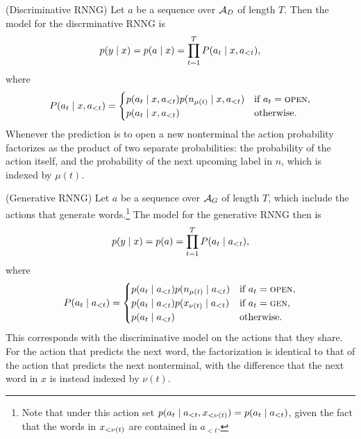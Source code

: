     \begin{definition}{(Discriminative RNNG)}
      \label{def:disc-rnng}
      Let $a$ be a sequence over $\mathcal{A}_D$ of length $T$. Then the model for the discrminative RNNG is
      \begin{align*}
        p(y \mid x) = p(a \mid x) = \prod_{t=1}^T P( a_t \mid x, a_{<t}),
      \end{align*}
      where
      \begin{equation*}
        P( a_t \mid x, a_{<t}) =
        \begin{cases}
          p( a_t \mid x, a_{<t} ) p( n_{ \mu(t) } \mid x, a_{<t} ) & \text{if } a_t = \textsc{open},  \\
          p( a_t \mid x, a_{<t} ) & \text{otherwise.}  \\
        \end{cases}
      \end{equation*}
    Whenever the prediction is to open a new nonterminal the action probability factorizes as the product of two separate probabilities: the probability of the action itself, and the probability of the next upcoming label in $n$, which is indexed by $\mu(t)$.
    \end{definition}

    \begin{definition}{(Generative RNNG)}
      \label{def:gen-rnng}
      Let $a$ be a sequence over $\mathcal{A}_G$ of length $T$, which include the actions that generate words.\footnote{Note that under this action set $p(a_t \mid a_{<t}, x_{<\nu(t)}) = p(a_t \mid a_{<t})$, given the fact that the words in $x_{<\nu(t)}$ are contained in $a_{<t}$.} The model for the generative RNNG then is
      \begin{align*}
        p(y \mid x) = p(a) = \prod_{t=1}^T P( a_t \mid a_{<t}),
      \end{align*}
      where
      \begin{equation*}
        P( a_t \mid a_{<t} ) =
        \begin{cases}
          p( a_t \mid a_{<t} ) p(n_{ \mu(t) } \mid a_{<t} ) & \text{if } a_t = \textsc{open},  \\
          p( a_t \mid a_{<t} ) p(x_{ \nu(t) } \mid a_{<t} ) & \text{if } a_t = \textsc{gen},  \\
          p( a_t \mid a_{<t} ) & \text{otherwise.}  \\
        \end{cases}
      \end{equation*}
      This corresponds with the discriminative model on the actions that they share. For the action that predicts the next word, the factorization is identical to that of the action that predicts the next nonterminal, with the difference that the next word in $x$ is instead indexed by $\nu(t)$.
    \end{definition}

